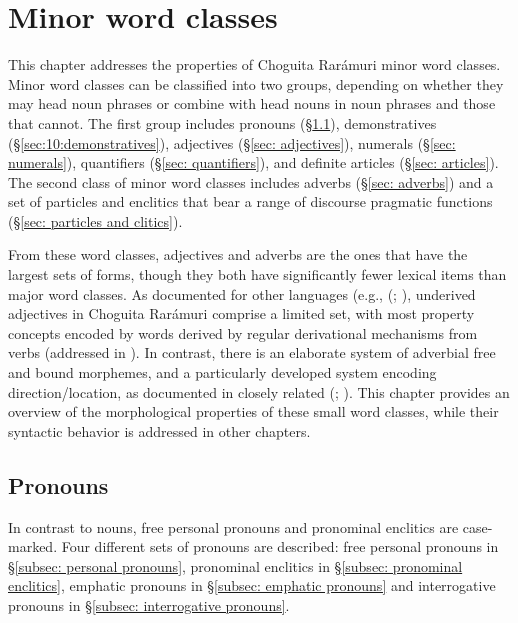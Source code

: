 \chapter{Minor word classes}
\label{chap: particles, adverbs and other word classes}

This chapter addresses the properties of Choguita Rarámuri minor word classes. Minor word classes can be classified into two groups, depending on whether they may head noun phrases or combine with head nouns in noun phrases and those that cannot. The first group includes pronouns (§\ref{sec:10:pronouns}), demonstratives (§\ref{sec:10:demonstratives}), adjectives (§\ref{sec: adjectives}), numerals (§\ref{sec: numerals}), quantifiers (§\ref{sec: quantifiers}), and definite articles (§\ref{sec: articles}). The second class of minor word classes includes adverbs (§\ref{sec: adverbs}) and a set of particles and enclitics that bear a range of discourse pragmatic functions (§\ref{sec: particles and clitics}).

From these word classes, adjectives and adverbs are the ones that have the largest sets of forms, though they both have significantly fewer lexical items than major word classes. As documented for other  languages (e.g.,  (; \citealt{hill2005grammar}), underived adjectives in Choguita Rarámuri comprise a limited set, with most property concepts encoded by words derived by regular derivational mechanisms from verbs (addressed in ). In contrast, there is an elaborate system of adverbial free and bound morphemes, and a particularly developed system encoding direction/location, as documented in closely related  (; \citealt{miller1996guarijio}). This chapter provides an overview of the morphological properties of these small word classes, while their syntactic behavior is addressed in other chapters.

\section{Pronouns}
\label{sec:10:pronouns}

In contrast to nouns, free personal pronouns and pronominal enclitics are case-marked. Four different sets of pronouns are described: free personal pronouns in §\ref{subsec: personal pronouns}, pronominal enclitics in §\ref{subsec: pronominal enclitics}, emphatic pronouns in §\ref{subsec: emphatic pronouns} and interrogative pronouns in §\ref{subsec: interrogative pronouns}.

